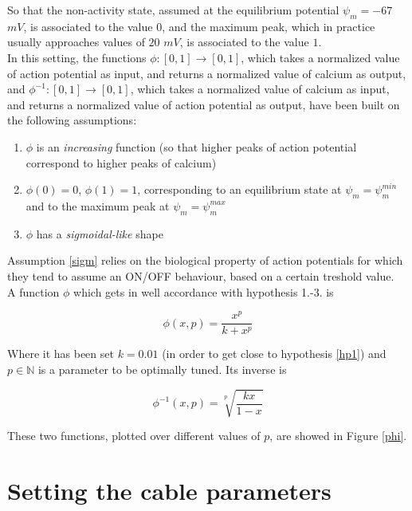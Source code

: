 \documentclass[12pt, a4paper]{report}
\begin{document}
So that the non-activity state, assumed at the equilibrium potential $\psi_m = -67$ $mV$, is associated to the value $0$, and the maximum peak, which in practice usually approaches values of $20$ $mV$, is associated to the value $1$.\\
In this setting, the functions $ \phi : [0,1] \rightarrow [0,1] $, which takes a normalized value of action potential as input, and returns a normalized value of calcium as output, and $ \phi^{-1} : [0,1] \rightarrow [0,1] $, which takes a normalized value of calcium as input, and returns a normalized value of action potential as output, have been built on the following assumptions:

\begin{enumerate}
	\item $\phi$ is  an \textit{increasing} function (so that higher peaks of action potential correspond to higher peaks of calcium) \label{hp1}
	
	\item $\phi (0) = 0 $, $\phi (1) = 1 $, corresponding to an equilibrium state at $\psi_m = \psi_m ^{min}$ and to the maximum peak at  $\psi_m = \psi_m ^{max}$
	
	\item $\phi$ has a \textit{sigmoidal-like} shape \label{sigm}
\end{enumerate}

Assumption \ref{sigm} relies on the biological property of  action potentials for which they tend to assume an ON/OFF behaviour, based on a certain treshold value.\\
A function  $\phi$ which gets in well accordance with hypothesis 1.-3. is

\begin{equation}
	\phi(x,p) = \frac{x^p}{k + x^p}
\end{equation}

Where it has been set $k=0.01$ (in order to get close to hypothesis \ref{hp1}) and $p \in \mathbb{N}$ is a parameter to be optimally tuned. Its inverse is

\begin{equation}
\phi^{-1}(x,p) = \sqrt[p]{\frac{kx}{1-x}}
\end{equation}

These two functions, plotted over different values of $p$, are showed in Figure \ref{phi}.


\section{Setting the cable parameters}
\end{document}
